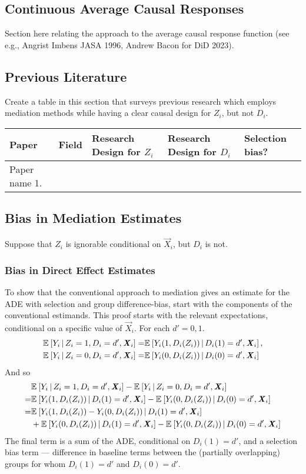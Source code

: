 \subsection{Continuous Average Causal Responses}
\label{appendix:continuous}
Section here relating the approach to the average causal response function (see e.g., Angrist Imbens JASA 1996, Andrew Bacon for DiD 2023).

\subsection{Previous Literature}
\label{appendix:mediation-review}

Create a table in this section that surveys previous research which employs mediation methods while having a clear causal design for $Z_i$, but not $D_i$.

\begin{tabular}{l l l l l}
    Paper & Field & Research Design for $Z_i$ & Research Design for $D_i$ & Selection bias? \\ \hline
    Paper name 1.    
\end{tabular}

\subsection{Bias in Mediation Estimates}
\label{appendix:mediation-bias}
Suppose that $Z_i$ is ignorable conditional on $\vec X_i$, but $D_i$ is not.

\subsubsection{Bias in Direct Effect Estimates}
To show that the conventional approach to mediation gives an estimate for the ADE with selection and group difference-bias, start with the components of the conventional estimands.
This proof starts with the relevant expectations, conditional on a specific value of $\vec X_i$.
For each $d' =0, 1$.
\begin{align*}
    \mathbb{E}_{} \left[ Y_i \, \middle\vert \, Z_i = 1, D_i = d', \boldsymbol{\mathit{X}}_i \right]
    =& \mathbb{E}_{} \left[ Y_i(1, D_i(Z_i)) \, \middle\vert \, D_i(1) = d', \boldsymbol{\mathit{X}}_i \right], \\
    \mathbb{E}_{} \left[ Y_i \, \middle\vert \, Z_i = 0, D_i = d', \boldsymbol{\mathit{X}}_i \right]
    =& \mathbb{E}_{} \left[ Y_i(0, D_i(Z_i)) \, \middle\vert \, D_i(0) = d', \boldsymbol{\mathit{X}}_i \right]
\end{align*}
And so
\begin{align*}
    &  \mathbb{E}_{} \left[ Y_i \, \middle\vert \, Z_i = 1, D_i = d', \boldsymbol{\mathit{X}}_i \right]
    - \mathbb{E}_{} \left[ Y_i \, \middle\vert \, Z_i = 0, D_i = d', \boldsymbol{\mathit{X}}_i \right] \\
    =& \mathbb{E}_{} \left[ Y_i(1, D_i(Z_i)) \, \middle\vert \, D_i(1) = d', \boldsymbol{\mathit{X}}_i \right]
    - \mathbb{E}_{} \left[ Y_i(0, D_i(Z_i)) \, \middle\vert \, D_i(0) = d', \boldsymbol{\mathit{X}}_i \right] \\
    =& \mathbb{E}_{} \left[ Y_i(1, D_i(Z_i)) - Y_i(0, D_i(Z_i)) \, \middle\vert \, D_i(1) = d', \boldsymbol{\mathit{X}}_i \right] \\
    &+ \mathbb{E}_{} \left[ Y_i(0, D_i(Z_i)) \, \middle\vert \, D_i(1) = d', \boldsymbol{\mathit{X}}_i \right]
        - \mathbb{E}_{} \left[ Y_i(0, D_i(Z_i)) \, \middle\vert \, D_i(0) = d', \boldsymbol{\mathit{X}}_i \right] 
\end{align*}
The final term is a sum of the ADE, conditional on $D_i(1) = d'$, and a selection bias term --- difference in baseline terms between the (partially overlapping) groups for whom $D_i(1) = d'$ and $D_i(0) = d'$.

